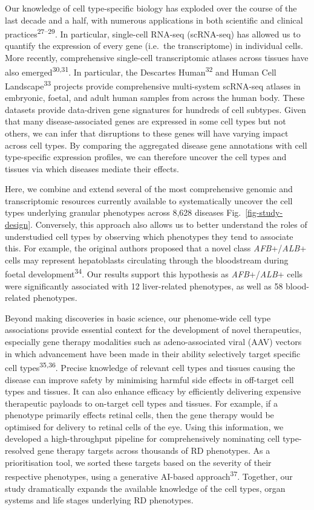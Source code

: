 \documentclass[
]{article}
\begin{document}
Our knowledge of cell type-specific biology has exploded over the course
of the last decade and a half, with numerous applications in both
scientific and clinical practices\textsuperscript{27--29}. In
particular, single-cell RNA-seq (scRNA-seq) has allowed us to quantify
the expression of every gene (i.e.~the transcriptome) in individual
cells. More recently, comprehensive single-cell transcriptomic atlases
across tissues have also emerged\textsuperscript{30,31}. In particular,
the Descartes Human\textsuperscript{32} and Human Cell
Landscape\textsuperscript{33} projects provide comprehensive
multi-system scRNA-seq atlases in embryonic, foetal, and adult human
samples from across the human body. These datasets provide data-driven
gene signatures for hundreds of cell subtypes. Given that many
disease-associated genes are expressed in some cell types but not
others, we can infer that disruptions to these genes will have varying
impact across cell types. By comparing the aggregated disease gene
annotations with cell type-specific expression profiles, we can
therefore uncover the cell types and tissues via which diseases mediate
their effects.

Here, we combine and extend several of the most comprehensive genomic
and transcriptomic resources currently available to systematically
uncover the cell types underlying granular phenotypes across 8,628
diseases Fig.~\ref{fig-study-design}. Conversely, this approach also
allows us to better understand the roles of understudied cell types by
observing which phenotypes they tend to associate this. For example, the
original authors proposed that a novel class \emph{AFB}+/\emph{ALB}+
cells may represent hepatoblasts circulating through the bloodstream
during foetal development\textsuperscript{34}. Our results support this
hypothesis as \emph{AFB}+/\emph{ALB}+ cells were significantly
associated with 12 liver-related phenotypes, as well as 58 blood-related
phenotypes.

Beyond making discoveries in basic science, our phenome-wide cell type
associations provide essential context for the development of novel
therapeutics, especially gene therapy modalities such as
adeno-associated viral (AAV) vectors in which advancement have been made
in their ability selectively target specific cell
types\textsuperscript{35,36}. Precise knowledge of relevant cell types
and tissues causing the disease can improve safety by minimising harmful
side effects in off-target cell types and tissues. It can also enhance
efficacy by efficiently delivering expensive therapeutic payloads to
on-target cell types and tissues. For example, if a phenotype primarily
effects retinal cells, then the gene therapy would be optimised for
delivery to retinal cells of the eye. Using this information, we
developed a high-throughput pipeline for comprehensively nominating cell
type-resolved gene therapy targets across thousands of RD phenotypes. As
a prioritisation tool, we sorted these targets based on the severity of
their respective phenotypes, using a generative AI-based
approach\textsuperscript{37}. Together, our study dramatically expands
the available knowledge of the cell types, organ systems and life stages
underlying RD phenotypes.
\end{document}
